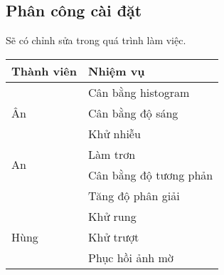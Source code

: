 \documentclass[margin = 1in]{extarticle}
\begin{document}
	\subsection{Phân công cài đặt}
		Sẽ có chỉnh sửa trong quá trình làm việc.
		\begin{table}[H]
			\centering
			\begin{tabular}{l | l}
				Thành viên & Nhiệm vụ\\
				\hline
				\multirow{3}{*}{Ân} & Cân bằng histogram\\
				& Cân bằng độ sáng\\
				& Khử nhiễu \\
				\hline
				\multirow{2}{*}{An} & Làm trơn \\
				& Cân bằng độ tương phản\\
				& Tăng độ phân giải\\
				\hline
				\multirow{3}{*}{Hùng} & Khử rung\\
				& Khử trượt \\
				& Phục hồi ảnh mờ\\		
			\end{tabular}
	\end{table}
		
		
\end{document}
